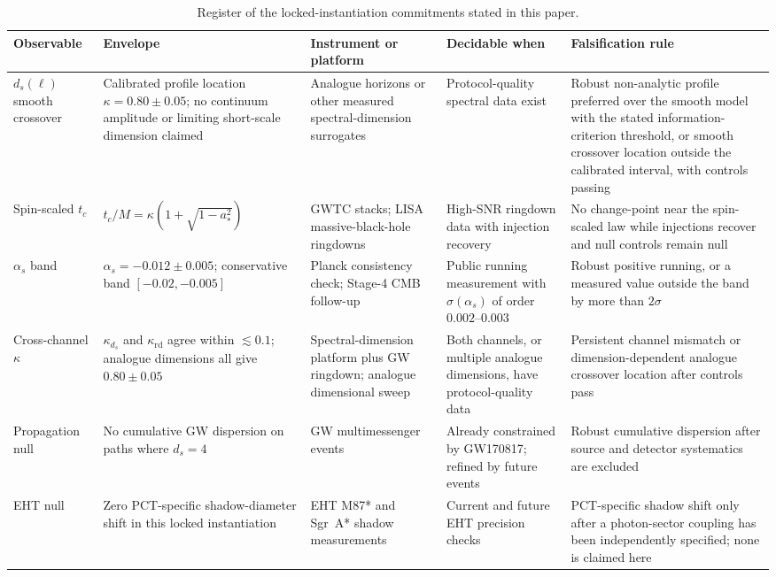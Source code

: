﻿\documentclass[12pt,a4paper]{article}
\theoremstyle{definition}
\begin{document}
\begin{table}[htbp]
\centering
\caption{Register of the locked-instantiation commitments stated in this paper.}
\label{tab:prediction_register}
\begin{tabular}{@{}p{2.5cm}p{3.1cm}p{2.5cm}p{2.6cm}p{3.6cm}@{}}
\toprule
Observable & Envelope & Instrument or platform & Decidable when & Falsification rule \\
\midrule
$d_s(\ell)$ smooth crossover & Calibrated profile location $\kappa=0.80\pm0.05$; no continuum amplitude or limiting short-scale dimension claimed & Analogue horizons or other measured spectral-dimension surrogates & Protocol-quality spectral data exist & Robust non-analytic profile preferred over the smooth model with the stated information-criterion threshold, or smooth crossover location outside the calibrated interval, with controls passing \\
Spin-scaled $t_c$ & $t_c/M=\kappa(1+\sqrt{1-a_\ast^2})$ & GWTC stacks; LISA massive-black-hole ringdowns & High-SNR ringdown data with injection recovery & No change-point near the spin-scaled law while injections recover and null controls remain null \\
$\alpha_s$ band & $\alpha_s=-0.012\pm0.005$; conservative band $[-0.02,-0.005]$ & Planck consistency check; Stage-4 CMB follow-up & Public running measurement with $\sigma(\alpha_s)$ of order $0.002$--$0.003$ & Robust positive running, or a measured value outside the band by more than $2\sigma$ \\
Cross-channel $\kappa$ & $\kappa_{d_s}$ and $\kappa_{\mathrm{rd}}$ agree within $\lesssim0.1$; analogue dimensions all give $0.80\pm0.05$ & Spectral-dimension platform plus GW ringdown; analogue dimensional sweep & Both channels, or multiple analogue dimensions, have protocol-quality data & Persistent channel mismatch or dimension-dependent analogue crossover location after controls pass \\
Propagation null & No cumulative GW dispersion on paths where $d_s=4$ & GW multimessenger events & Already constrained by GW170817; refined by future events & Robust cumulative dispersion after source and detector systematics are excluded \\
EHT null & Zero PCT-specific shadow-diameter shift in this locked instantiation & EHT M87* and Sgr~A* shadow measurements & Current and future EHT precision checks & PCT-specific shadow shift only after a photon-sector coupling has been independently specified; none is claimed here \\
\bottomrule
\end{tabular}
\end{table}
\end{document}
